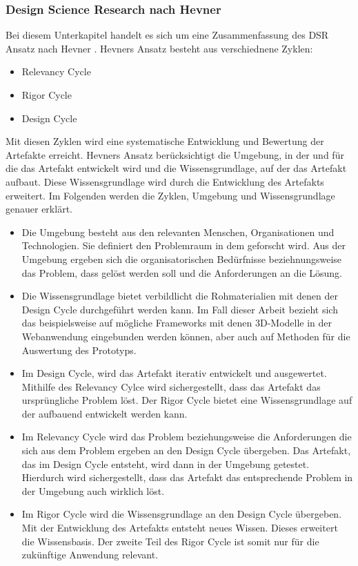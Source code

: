 \subsubsection{Design Science Research nach Hevner}
Bei diesem Unterkapitel handelt es sich um eine Zusammenfassung des \ac{DSR} Ansatz nach Hevner \cite[S.~79-81]{Hevner2004}. Hevners Ansatz besteht aus verschiednene Zyklen:

\begin{itemize}
    \item Relevancy Cycle
    \item Rigor Cycle 
    \item Design Cycle
\end{itemize}

Mit diesen Zyklen wird eine systematische Entwicklung und Bewertung der Artefakte erreicht. Hevners Ansatz berücksichtigt die Umgebung, in der und für die das Artefakt entwickelt wird und die Wissensgrundlage, auf der das Artefakt aufbaut. Diese Wissensgrundlage wird durch die Entwicklung des Artefakts erweitert. Im Folgenden werden die Zyklen, Umgebung und Wissensgrundlage genauer erklärt.

\begin{itemize}
    \item Die Umgebung besteht aus den relevanten Menschen, Organisationen und Technologien. Sie definiert den Problemraum in dem geforscht wird. Aus der Umgebung ergeben sich die organisatorischen Bedürfnisse beziehnungsweise das Problem, dass gelöst werden soll und die Anforderungen an die Lösung.
    \item Die Wissensgrundlage bietet verbildlicht die Rohmaterialien mit denen der Design Cycle durchgeführt werden kann. Im Fall dieser Arbeit bezieht sich das beispielsweise auf mögliche Frameworks mit denen 3D-Modelle in der Webanwendung eingebunden werden können, aber auch auf Methoden für die Auswertung des Prototyps.
    \item Im Design Cycle, wird das Artefakt iterativ entwickelt und ausgewertet. Mithilfe des Relevancy Cylce wird sichergestellt, dass das Artefakt das ursprüngliche Problem löst. Der Rigor Cycle bietet eine Wissensgrundlage auf der aufbauend entwickelt werden kann.
    \item Im Relevancy Cycle wird das Problem beziehungsweise die Anforderungen die sich aus dem Problem ergeben an den Design Cycle übergeben. Das Artefakt, das im Design Cycle entsteht, wird dann in der Umgebung getestet. Hierdurch wird sichergestellt, dass das Artefakt das entsprechende Problem in der Umgebung auch wirklich löst.
    \item Im Rigor Cycle wird die Wissensgrundlage an den Design Cycle übergeben. Mit der Entwicklung des Artefakts entsteht neues Wissen. Dieses erweitert die Wissensbasis. Der zweite Teil des Rigor Cycle ist somit nur für die zukünftige Anwendung relevant.
\end{itemize}


